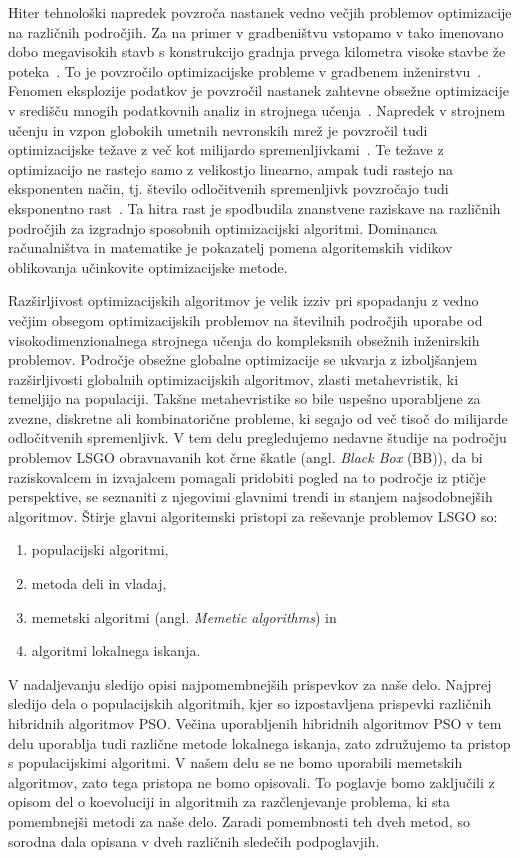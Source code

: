 Hiter tehnološki napredek povzroča nastanek vedno večjih problemov optimizacije na različnih področjih.
Za na primer v gradbeništvu vstopamo v tako imenovano dobo megavisokih stavb s konstrukcijo gradnja prvega kilometra visoke stavbe že poteka~\cite{bib:tallest_20}.
To je povzročilo optimizacijske probleme v gradbenem inženirstvu~\cite{bib:lsgo_engineering}.
Fenomen eksplozije podatkov je povzročil nastanek zahtevne obsežne optimizacije v središču mnogih podatkovnih analiz in strojnega učenja~\cite{bib:lsgo_machine_learning}.
Napredek v strojnem učenju in vzpon globokih umetnih nevronskih mrež je povzročil tudi optimizacijske težave z več kot milijardo spremenljivkami~\cite{bib:lsgo_deep_learning}.
Te težave z optimizacijo ne rastejo samo z velikostjo linearno, ampak tudi rastejo na eksponenten način, tj. število odločitvenih spremenljivk povzročajo tudi eksponentno rast~\cite{bib:lsgo_exponential_grouth}.
Ta hitra rast je spodbudila znanstvene raziskave na različnih področjih za izgradnjo sposobnih optimizacijski algoritmi.
Dominanca računalništva in matematike je pokazatelj pomena algoritemskih vidikov oblikovanja učinkovite optimizacijske metode.

Razširljivost optimizacijskih algoritmov je velik izziv pri spopadanju z vedno večjim obsegom optimizacijskih problemov na številnih področjih uporabe od visokodimenzionalnega strojnega učenja do kompleksnih obsežnih inženirskih problemov.
Področje obsežne globalne optimizacije se ukvarja z izboljšanjem razširljivosti globalnih optimizacijskih algoritmov, zlasti metahevristik, ki temeljijo na populaciji.
Takšne metahevristike so bile uspešno uporabljene za zvezne, diskretne ali kombinatorične probleme, ki segajo od več tisoč do milijarde odločitvenih spremenljivk.
V tem delu pregledujemo nedavne študije na področju problemov LSGO obravnavanih kot črne škatle (angl. \textit{Black Box} (BB)), da bi raziskovalcem in izvajalcem pomagali pridobiti pogled na to področje iz ptičje perspektive, se seznaniti z njegovimi glavnimi trendi in stanjem najsodobnejših algoritmov.
Štirje glavni algoritemski pristopi za reševanje problemov LSGO so:
\begin{enumerate}
	\item populacijski algoritmi,
	\item metoda deli in vladaj,
	\item memetski algoritmi (angl. \textit{Memetic algorithms}) in
	\item algoritmi lokalnega iskanja.
\end{enumerate}
V nadaljevanju sledijo opisi najpomembnejših prispevkov za naše delo.
Najprej sledijo dela o populacijskih algoritmih, kjer so izpostavljena prispevki različnih hibridnih algoritmov PSO.
Večina uporabljenih hibridnih algoritmov PSO v tem delu uporablja tudi različne metode lokalnega iskanja, zato združujemo ta pristop s populacijskimi algoritmi.
V našem delu se ne bomo uporabili memetskih algoritmov, zato tega pristopa ne bomo opisovali.
To poglavje bomo zaključili z opisom del o koevoluciji in algoritmih za razčlenjevanje problema, ki sta pomembnejši metodi za naše delo.
Zaradi pomembnosti teh dveh metod, so sorodna dala opisana v dveh različnih sledečih podpoglavjih.

